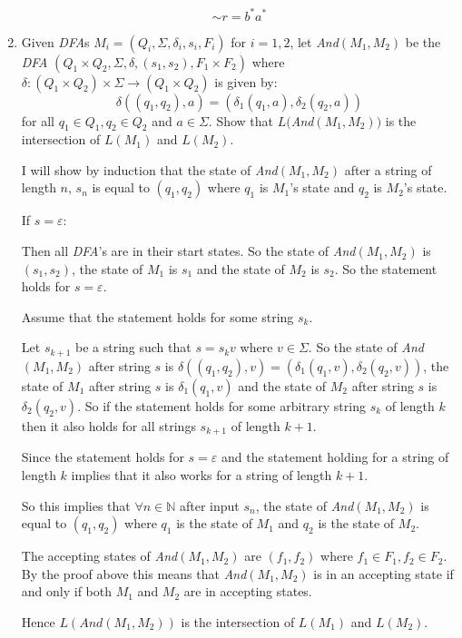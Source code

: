 \documentclass[10pt,\jkfside,a4paper]{article}
\newcommand{\dfa}{\textit{DFA} }
\newcommand{\andautomaton}{\textit{And}$(M_1, M_2)$ }
\begin{document}
\begin{enumerate}
\[
\sim r = b^*a^*
\]

\item Given \textit{DFA}s  $M_i = (Q_i, \Sigma, \delta_i, s_i, F_i)$ for $i = 1, 2$, let \textit{And}$(M_1, M_2)$ 
be the \dfa $(Q_1 \times Q_2, \Sigma, \delta, (s_1, s_2), F_1 \times F_2)$ where $\delta : (Q_1 \times Q_2) \times \Sigma \longrightarrow (Q_1 \times Q_2)$ is 
given by:
\[
\delta((q_1, q_2), a) = (\delta_1(q_1, a), \delta_2(q_2, a))
\]
for all $q_1 \in Q_1, q_2 \in Q_2$ and $a \in \Sigma$. Show that $L($\textit{And}$(M_1, M_2))$ is the 
intersection of $L(M_1)$ and $L(M_2)$.

I will show by induction that the state of \andautomaton after a string of length $n$, $s_n$ 
is equal to $(q_1, q_2)$ where $q_1$ is $M_1$'s 
state and $q_2$ is $M_2$'s state.

If $s = \varepsilon$:

Then all \textit{DFA}'s are in their start states. So the state of \andautomaton is $(s_1, s_2)$, the 
state of $M_1$ is $s_1$ and the state of $M_2$ is $s_2$. So the statement holds for $s = \varepsilon$.

\vspace{0.1cm}

Assume that the statement holds for some string $s_k$. 

Let $s_{k+1}$ be a string such that $s=s_kv$ where $v \in \Sigma$.
So the state of \andautomaton after string $s$ is $\delta((q_1, q_2), v) = (\delta_1(q_1, v), \delta_2(q_2, v))$, 
the state of $M_1$ after 
string $s$ is $\delta_1(q_1, v)$ and the state of $M_2$ after string $s$ is $\delta_2(q_2, v)$. 
So if the statement holds for some arbitrary string $s_k$ of length $k$ then it also holds for all 
strings $s_{k+1}$ of length $k+1$.

\vspace{0.1cm}

Since the statement holds for $s = \varepsilon$ and the statement holding for a string of length $k$ implies 
that it also works for a string of length $k + 1$.

So this implies that $\forall n \in \mathbb{N}$ after input $s_n$, the state of \andautomaton is equal to $(q_1, q_2)$ where $q_1$ is the 
state of $M_1$ and $q_2$ is the state of $M_2$.

The accepting states of \andautomaton are $(f_1, f_2)$ where $f_1 \in F_1, f_2 \in F_2$. By the proof above this 
means that \andautomaton is in an accepting state if and only if both $M_1$ and $M_2$ are in accepting states.

Hence $L(\textit{And}(M_1, M_2))$ is the intersection of $L(M_1)$ and $L(M_2)$.

\end{enumerate}
\end{document}
